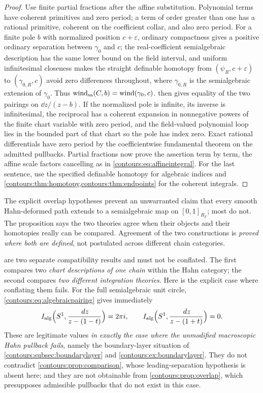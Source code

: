 \documentclass[11pt,letterpaper]{article}
\theoremstyle{definition}
\theoremstyle{remark}
\numberwithin{equation}{section}
\begin{document}
\begin{proof}
Use finite partial fractions after the affine substitution. Polynomial terms have
coherent primitives and zero period; a term of order greater than one has a rational
primitive, coherent on the coefficient collar, and also zero period. For a finite
pole $b$ with normalized position $c+\varepsilon$, ordinary compactness gives a
positive ordinary separation between $\gamma_0$ and $c$; the real-coefficient
semialgebraic description has the same lower bound on the field interval, and
uniform infinitesimal closeness makes the straight definable homotopy from
$(\psi_R,c+\varepsilon)$ to $(\gamma_{0,R},c)$ avoid zero differences throughout,
where $\gamma_{0,R}$ is the semialgebraic extension of $\gamma_0$. Thus
$\operatorname{wind}_{\mathrm{sa}}(C,b)=\operatorname{wind}(\gamma_0,c)$.  then
gives equality of the two pairings on $\dd z/(z-b)$. If the normalized pole is
infinite, its inverse is infinitesimal, the reciprocal has a coherent expansion in
nonnegative powers of the finite chart variable with zero period, and the
field-valued polynomial loop lies in the bounded part of that chart so the pole has
index zero. Exact rational differentials have zero period by the coefficientwise
fundamental theorem on the admitted pullbacks. Partial fractions now prove the
assertion term by term, the affine scale factors cancelling as in
\eqref{contours:eq:affineintegral}. For the last sentence, use the specified
definable homotopy for algebraic indices and
\cref{contours:thm:homotopy,contours:thm:endpoints} for the coherent integrals.
\end{proof}

The explicit overlap hypotheses prevent an unwarranted claim that every smooth
Hahn-deformed path extends to a semialgebraic map on $[0,1]_{R_\Gamma}$; most do
not. The proposition says the two theories agree when their objects and their
homotopies really can be compared. Agreement of the two constructions is
\emph{proved where both are defined}, not postulated across different chain
categories.

 are two separate
compatibility results and must not be conflated. The first compares two
\emph{chart descriptions of one chain} within the Hahn category; the second
compares \emph{two different integration theories}. Here is the explicit case where
conflating them fails. For the full semialgebraic unit circle,
\eqref{contours:eq:algebraicpairing} gives immediately
\begin{equation}\label{contours:eq:algcircleboundary}
  I_{\mathrm{alg}}\Bigl(S^1,\frac{\,d z}{z-(1-t)}\Bigr)=2\pi i,
  \qquad
  I_{\mathrm{alg}}\Bigl(S^1,\frac{\,d z}{z-(1+t)}\Bigr)=0 .
\end{equation}
These are legitimate values \emph{in exactly the case where the unmodified
macroscopic Hahn pullback fails}, namely the boundary-layer situation of
\cref{contours:subsec:boundarylayer} and \cref{contours:ex:boundarylayer}. They do
not contradict \cref{contours:prop:comparison}, whose leading-separation hypothesis
is absent here; and they are not obtainable from \cref{contours:prop:overlap}, which
presupposes admissible pullbacks that do not exist in this case.
\end{document}
